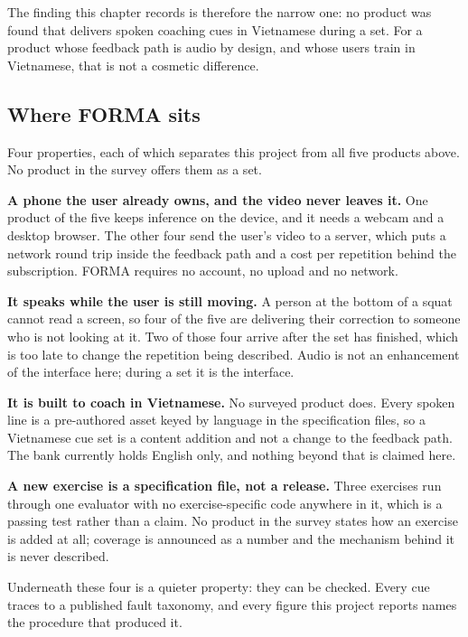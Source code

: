 The finding this chapter records is therefore the narrow one: no product was found that delivers spoken coaching cues in Vietnamese during a set. For a product whose feedback path is audio by design, and whose users train in Vietnamese, that is not a cosmetic difference.

\subsection{Where FORMA sits}
\label{sec:2.4.2}

Four properties, each of which separates this project from all five products above. No product in the survey offers them as a set.

\textbf{A phone the user already owns, and the video never leaves it.} One product of the five keeps inference on the device, and it needs a webcam and a desktop browser. The other four send the user's video to a server, which puts a network round trip inside the feedback path and a cost per repetition behind the subscription. FORMA requires no account, no upload and no network.

\textbf{It speaks while the user is still moving.} A person at the bottom of a squat cannot read a screen, so four of the five are delivering their correction to someone who is not looking at it. Two of those four arrive after the set has finished, which is too late to change the repetition being described. Audio is not an enhancement of the interface here; during a set it is the interface.

\textbf{It is built to coach in Vietnamese.} No surveyed product does. Every spoken line is a pre-authored asset keyed by language in the specification files, so a Vietnamese cue set is a content addition and not a change to the feedback path. The bank currently holds English only, and nothing beyond that is claimed here.

\textbf{A new exercise is a specification file, not a release.} Three exercises run through one evaluator with no exercise-specific code anywhere in it, which is a passing test rather than a claim. No product in the survey states how an exercise is added at all; coverage is announced as a number and the mechanism behind it is never described.

Underneath these four is a quieter property: they can be checked. Every cue traces to a published fault taxonomy, and every figure this project reports names the procedure that produced it.
